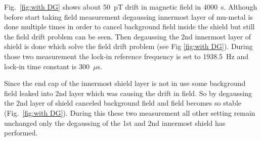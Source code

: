 Fig.~\ref{fig:with DG} shows about 50~pT drift in magnetic field in
4000~s. Although before start taking field measurement degaussing
innermost layer of mu-metal is done multiple times in order to cancel background field inside the shield  but still the  field
drift problem can be seen. Then degaussing the 2nd innermost layer of
shield is done which solve the field drift problem (see Fig \ref{fig:with DG}). During those two measurement the
lock-in reference frequency is set to 1938.5~Hz and lock-in time
constant is 300~$\mu$s. 

Since the end cap of the innermost shield layer is not in use some
background field leaked into 2nd layer which was causing the drift in
field. So by degaussing the 2nd layer of shield canceled background
field and field becomes so stable (Fig.~\ref{fig:with DG}). During this
these two measurement all other setting remain unchanged only the degaussing
of the 1st and 2nd innermost shield has performed.
   
  
